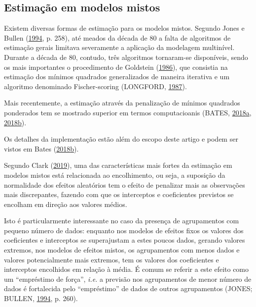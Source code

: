\documentclass[
  a4paper, 11pt]{article}
\begin{document}
\hypertarget{estimauxe7uxe3o-em-modelos-mistos}{%
\subsection{Estimação em modelos
mistos}\label{estimauxe7uxe3o-em-modelos-mistos}}

Existem diversas formas de estimação para os modelos mistos. Segundo
Jones e Bullen (\protect\hyperlink{ref-jones1994}{1994}, p. 258), até
meados da década de 80 a falta de algoritmos de estimação gerais
limitava severamente a aplicação da modelagem multinível. Durante a
década de 80, contudo, três algoritmos tornaram-se disponíveis, sendo os
mais importantes o procedimento de Goldstein
(\protect\hyperlink{ref-goldstein}{1986}), que consistia na estimação
dos mínimos quadrados generalizados de maneira iterativa e um algoritmo
denominado Fischer-scoring (LONGFORD,
\protect\hyperlink{ref-longford}{1987}).

Mais recentemente, a estimação através da penalização de mínimos
quadrados ponderados tem se mostrado superior em termos computacioanis
(BATES,
\protect\hyperlink{ref-Bates3}{2018}\protect\hyperlink{ref-Bates3}{a},
\protect\hyperlink{ref-Bates2}{2018}\protect\hyperlink{ref-Bates2}{b}).

Os detalhes da implementação estão além do escopo deste artigo e podem
ser vistos em Bates
(\protect\hyperlink{ref-Bates2}{2018}\protect\hyperlink{ref-Bates2}{b}).

Segundo Clark (\protect\hyperlink{ref-clark2019shrinkage}{2019}), uma
das características mais fortes da estimação em modelos mistos está
relacionada ao encolhimento, ou seja, a suposição da normalidade dos
efeitos aleatórios tem o efeito de penalizar mais as observações mais
discrepantes, fazendo com que os interceptos e coeficientes previstos se
encolham em direção aos valores médios.

Isto é particularmente interessante no caso da presença de agrupamentos
com pequeno número de dados: enquanto nos modelos de efeitos fixos os
valores dos coeficientes e interceptos se superajustam a estes poucos
dados, gerando valores extremos, nos modelos de efeitos mistos, os
agrupamentos com menos dados e valores potencialmente mais extremos, tem
os valores dos coeficientes e interceptos encolhidos em relação à média.
É comum se referir a este efeito como um ``empréstimo de força'',
\emph{i.e.} a previsão nos agrupamentos de menor número de dados é
fortalecida pelo ``empréstimo'' de dados de outros agrupamentos (JONES;
BULLEN, \protect\hyperlink{ref-jones1994}{1994}, p. 260).
\end{document}
